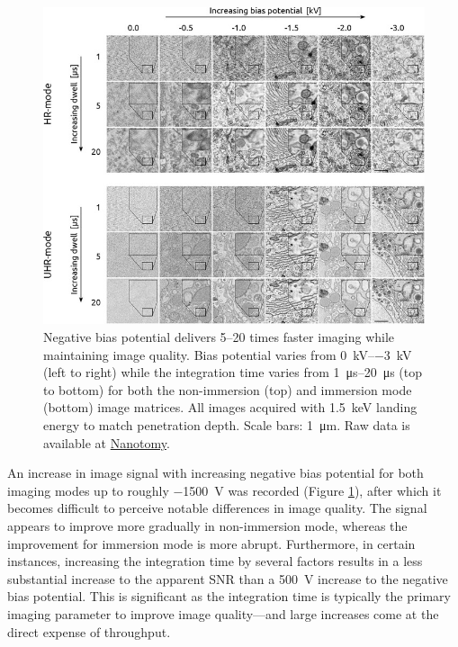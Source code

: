 \begin{figure}[!tbh]
    \centering
    \includegraphics[width=\linewidth]{chapter-2/figures_JPEG_LQ/fig2-3_matrices.jpg}
    \caption{Negative bias potential delivers 5--20 times faster imaging while maintaining image quality. Bias potential varies from \SIrange[range-phrase=\text{ to }]{0}{-3}{\kilo\volt} (left to right) while the integration time varies from \SIrange[range-phrase=\text{ to }]{1}{20}{\micro\second} (top to bottom) for both the non-immersion (top) and immersion mode (bottom) image matrices. All images acquired with \SI{1.5}{\kilo\electronvolt} landing energy to match penetration depth. Scale bars: \SI{1}{\micro\meter}. Raw data is available at \href{www.nanotomy.org}{Nanotomy}.}
    \label{fig:2.3_matrices}
\end{figure}

An increase in image signal with increasing negative bias potential for both imaging modes up to roughly \SI{-1500}{\volt} was recorded (Figure \ref{fig:2.3_matrices}), after which it becomes difficult to perceive notable differences in image quality. The signal appears to improve more gradually in non-immersion mode, whereas the improvement for immersion mode is more abrupt. Furthermore, in certain instances, increasing the integration time by several factors results in a less substantial increase to the apparent SNR than a \SI{500}{\volt} increase to the negative bias potential. This is significant as the integration time is typically the primary imaging parameter to improve image quality—and large increases come at the direct expense of throughput.


